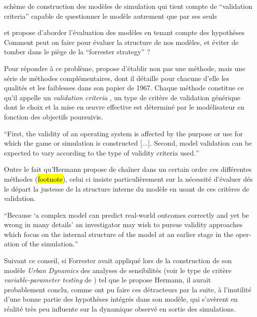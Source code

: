  schème de construction des modèles de simulation qui tient compte de \enquote{validation criteria} capable de questionner le modèle autrement que par ses seuls

  et propose d'aborder l'évaluation des modèles en tenant compte des hypothèses  Comment peut on faire pour évaluer la structure de nos modèles, et éviter de tomber dans le piège de la \enquote{forrester strategy} ?

Pour répondre à ce problème, \textcite{Hermann1967, Hermann1967b} propose d'établir non pas une méthode, mais une série de méthodes complémentaires, dont il détaille pour chacune d'elle les qualités et les faiblesses dans son papier de 1967. Chaque méthode constitue ce qu'il appelle un \textit{validation criteria} , un type de critère de validation générique dont le choix et la mise en œuvre effective est déterminé par le modélisateur en fonction des objectifs poursuivis.

\foreignquote{english}{First, the validity of an operating system is affected by the purpose or use for which the game or simulation is constructed [...]. Second, model validation can be expected to vary according to the type of validity criteria used.}\autocite[217]{Hermann1967}

Outre le fait qu'Hermann propose de chaîner dans un certain ordre ces différentes méthodes (\hl{footnote}), celui ci insiste particulièrement sur la nécessité d'évaluer dés le départ la justesse de la structure interne du modèle en usant de ces critères de validation.

\foreignquote{english}{Because \enquote{a complex model can predict real-world outcomes correctly and yet be wrong in many details} \autocite[64]{Pool1965} an investigator may wish to pursue validity approaches which focus on the internal structure of the model at an earlier stage in the operation of the simulation.} \autocite[226]{Hermann1967}

Suivant ce conseil, si Forrester avait appliqué lors de la construction de son modèle \textit{Urban Dynamics} des analyses de sensibilités (voir le type de critère \textit{variable-parameter testing} de \autocite{Hermann1967}) tel que le propose Hermann, il aurait probablement conclu, comme ont pu faire ces détracteurs par la suite, à l'inutilité d'une bonne partie des hypothèses intégrés dans son modèle, qui s'avèrent en réalité très peu influente sur la dynamique observé en sortie des simulations.

